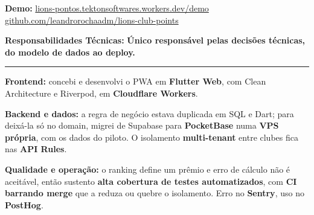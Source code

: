 \documentclass[9pt,a4paper]{extarticle}
\newcommand{\fld}[1]{{\color{muted}\textbf{#1}}}
\newcommand{\lbl}[1]{\textbf{#1}}
\newenvironment{tight}{%
  \begin{list}{\textcolor{rule}{\rule[0.18em]{0.32em}{0.32em}}}{%
    \setlength{\leftmargin}{1.15em}%
    \setlength{\labelwidth}{0.60em}%
    \setlength{\labelsep}{0.55em}%
    \setlength{\topsep}{0.30em}%
    \setlength{\itemsep}{0.32em}%
    \setlength{\parsep}{0pt}%
    \setlength{\partopsep}{0pt}%
    \setlength{\rightmargin}{0pt}%
  }%
}{\end{list}}
\begin{document}
\fld{Demo:} \href{http://lions-pontos.tektonsoftwares.workers.dev/demo}{lions-pontos.tektonsoftwares.workers.dev/demo} \quad \fld{Código:} \href{http://github.com/leandrorochaadm/lions-club-points}{github.com/leandrorochaadm/lions-club-points}

\fld{Responsabilidades Técnicas:} \textbf{Único responsável pelas decisões técnicas, do modelo de dados ao deploy.}
\begin{tight}
  \item \lbl{Frontend:} concebi e desenvolvi o PWA em \textbf{Flutter Web}, com Clean Architecture e Riverpod, em \textbf{Cloudflare Workers}.
  \item \lbl{Backend e dados:} a regra de negócio estava duplicada em SQL e Dart; para deixá-la só no domain, migrei de Supabase para \textbf{PocketBase} numa \textbf{VPS própria}, com os dados do piloto. O isolamento \textbf{multi-tenant} entre clubes fica nas \textbf{API Rules}.
  \item \lbl{Qualidade e operação:} o ranking define um prêmio e erro de cálculo não é aceitável, então sustento \textbf{alta cobertura de testes automatizados}, com \textbf{CI barrando merge} que a reduza ou quebre o isolamento. Erro no \textbf{Sentry}, uso no \textbf{PostHog}.
\end{tight}
\end{document}
